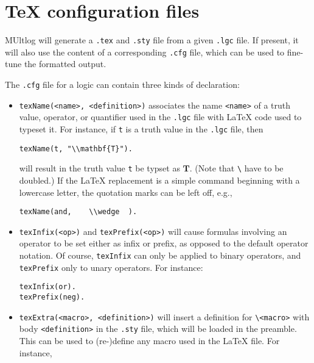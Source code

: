 \documentclass[]{article}
\begin{document}
\hypertarget{tex-configuration-files}{%
\section{TeX configuration files}\label{tex-configuration-files}}

MUltlog will generate a \texttt{.tex} and \texttt{.sty} file from a
given \texttt{.lgc} file. If present, it will also use the content of a
corresponding \texttt{.cfg} file, which can be used to fine-tune the
formatted output.

The \texttt{.cfg} file for a logic can contain three kinds of
declaration:

\begin{itemize}
\item
  \texttt{texName(\textless{}name\textgreater{},\ \textless{}definition\textgreater{})}
  associates the name \texttt{\textless{}name\textgreater{}} of a truth
  value, operator, or quantifier used in the \texttt{.lgc} file with
  LaTeX code used to typeset it. For instance, if \texttt{t} is a truth
  value in the \texttt{.lgc} file, then

\begin{verbatim}
texName(t, "\\mathbf{T}").
\end{verbatim}

  will result in the truth value \texttt{t} be typset as \(\mathbf{T}\).
  (Note that \texttt{\textbackslash{}} have to be doubled.) If the LaTeX
  replacement is a simple command beginning with a lowercase letter, the
  quotation marks can be left off, e.g.,

\begin{verbatim}
texName(and,    \\wedge  ).
\end{verbatim}
\item
  \texttt{texInfix(\textless{}op\textgreater{})} and
  \texttt{texPrefix(\textless{}op\textgreater{})} will cause formulas
  involving an operator to be set either as infix or prefix, as opposed
  to the default operator notation. Of course, \texttt{texInfix} can
  only be applied to binary operators, and \texttt{texPrefix} only to
  unary operators. For instance:

\begin{verbatim}
texInfix(or).
texPrefix(neg).
\end{verbatim}
\item
  \texttt{texExtra(\textless{}macro\textgreater{},\ \textless{}definition\textgreater{})}
  will insert a definition for
  \texttt{\textbackslash{}\textless{}macro\textgreater{}} with body
  \texttt{\textless{}definition\textgreater{}} in the \texttt{.sty}
  file, which will be loaded in the preamble. This can be used to
  (re-)define any macro used in the LaTeX file. For instance,


\end{itemize}
\end{document}
